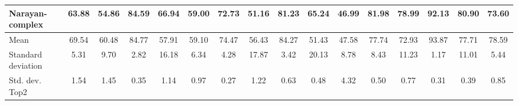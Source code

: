 \documentclass[sigconf,nonacm]{acmart}
\begin{document}
\begin{table*}[]
{\begin{tabular}{@{}l|ccccc|ccccc|ccccc@{}}
Narayan-complex       & 63.88          & 54.86          & 84.59          & 66.94          & 59.00          & 72.73          & 51.16          & 81.23          & 65.24          & 46.99          & 81.98          & 78.99          & 92.13          & 80.90          & 73.60          \\ \midrule
Mean                  & 69.54          & 60.48          & 84.77          & 57.91          & 59.10          & 74.47          & 56.43          & 84.27          & 51.43          & 47.58          & 77.74          & 72.93          & 93.87          & 77.71          & 78.59          \\
Standard deviation             & 5.31           & 9.70           & 2.82           & 16.18          & 6.34           & 4.28           & 17.87          & 3.42           & 20.13          & 8.78           & 8.43           & 11.23          & 1.17           & 11.01          & 5.44           \\
Std. dev. Top2        & 1.54           & 1.45           & 0.35           & 1.14           & 0.97           & 0.27           & 1.22           & 0.63           & 0.48           & 4.32           & 0.50           & 0.77           & 0.31           & 0.39           & 0.85           \\ \bottomrule
\end{tabular}}
\end{table*} \begin{table*}[]
\centering
{}
\end{table*}
\end{document}
